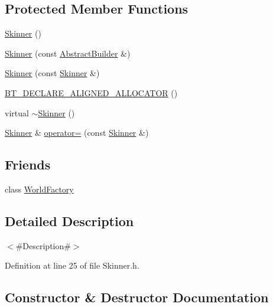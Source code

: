 \subsection*{Protected Member Functions}
\begin{DoxyCompactItemize}
\item 
\mbox{\hyperlink{classnjli_1_1_skinner_a971fdfce176805ad32671fa772f355b9}{Skinner}} ()
\item 
\mbox{\hyperlink{classnjli_1_1_skinner_ab8f209901a9b9978be443c0c1d13b345}{Skinner}} (const \mbox{\hyperlink{classnjli_1_1_abstract_builder}{Abstract\+Builder}} \&)
\item 
\mbox{\hyperlink{classnjli_1_1_skinner_acae70ea7c8a5dbbcb8f8483a9fcf513c}{Skinner}} (const \mbox{\hyperlink{classnjli_1_1_skinner}{Skinner}} \&)
\item 
\mbox{\hyperlink{classnjli_1_1_skinner_a701e75f62ec38a9c39d88abd4f782c1e}{B\+T\+\_\+\+D\+E\+C\+L\+A\+R\+E\+\_\+\+A\+L\+I\+G\+N\+E\+D\+\_\+\+A\+L\+L\+O\+C\+A\+T\+OR}} ()
\item 
virtual \mbox{\hyperlink{classnjli_1_1_skinner_aea41a660450f27b02e5c6631d6a7b964}{$\sim$\+Skinner}} ()
\item 
\mbox{\hyperlink{classnjli_1_1_skinner}{Skinner}} \& \mbox{\hyperlink{classnjli_1_1_skinner_ad9d630dddb556f8855c126e6892eb25a}{operator=}} (const \mbox{\hyperlink{classnjli_1_1_skinner}{Skinner}} \&)
\end{DoxyCompactItemize}
\subsection*{Friends}
\begin{DoxyCompactItemize}
\item 
class \mbox{\hyperlink{classnjli_1_1_skinner_acb96ebb09abe8f2a37a915a842babfac}{World\+Factory}}
\end{DoxyCompactItemize}


\subsection{Detailed Description}
$<$\#\+Description\#$>$ 

Definition at line 25 of file Skinner.\+h.



\subsection{Constructor \& Destructor Documentation}
\mbox{\label{classnjli_1_1_skinner_a971fdfce176805ad32671fa772f355b9}} 
